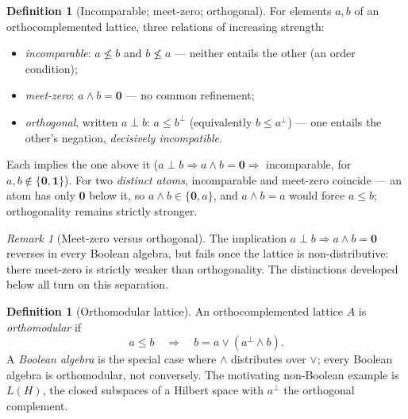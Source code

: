 \documentclass[11pt,reqno]{amsart}
\theoremstyle{plain}
\theoremstyle{definition}
\newtheorem{definition}[theorem]{Definition}
\theoremstyle{remark}
\newtheorem{remark}[theorem]{Remark}
\begin{document}
\begin{definition}[Incomparable; meet-zero; orthogonal]\label{def:ortho}
For elements $a,b$ of an orthocomplemented lattice, three relations of
increasing strength:
\begin{itemize}[noitemsep, topsep=2pt]
  \item \emph{incomparable}: $a\not\leq b$ and $b\not\leq a$ --- neither
    entails the other (an order condition);
  \item \emph{meet-zero}: $a\wedge b=\mathbf 0$ --- no common refinement;
  \item \emph{orthogonal}, written $a\perp b$: $a\leq b^\perp$ (equivalently
    $b\leq a^\perp$) --- one entails the other's negation, \emph{decisively
    incompatible}.
\end{itemize}
Each implies the one above it ($a\perp b\Rightarrow a\wedge b=\mathbf 0
\Rightarrow$ incomparable, for $a,b\notin\{\mathbf 0,\mathbf 1\}$). For two
\emph{distinct atoms}, incomparable and meet-zero coincide --- an atom has only
$\mathbf 0$ below it, so $a\wedge b\in\{\mathbf 0,a\}$, and $a\wedge b=a$ would
force $a\leq b$; orthogonality remains strictly stronger.
\end{definition}

\begin{remark}[Meet-zero versus orthogonal]\label{rem:gap}
The implication $a\perp b\Rightarrow a\wedge b=\mathbf 0$ reverses in every
Boolean algebra, but fails once the lattice is non-distributive: there
meet-zero is strictly weaker than orthogonality. The distinctions developed
below all turn on this separation.
\end{remark}

\begin{definition}[Orthomodular lattice]\label{def:oml}
An orthocomplemented lattice $A$ is \emph{orthomodular} if
\begin{equation}\label{eq:oml-law}
  a \leq b \quad\Longrightarrow\quad b = a \vee (a^\perp \wedge b).
\end{equation}
A \emph{Boolean algebra} is the special case where $\wedge$ distributes
over $\vee$; every Boolean algebra is orthomodular, not conversely. The
motivating non-Boolean example is $L(H)$, the closed subspaces of a
Hilbert space with $a^\perp$ the orthogonal complement.
\end{definition}
\end{document}
